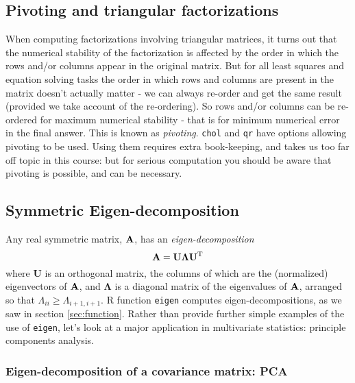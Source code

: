 \documentclass[10pt] {article}
\newcommand{\ts}{^{\rm T}}
\theoremstyle{definition}
\begin{document}
\subsection{Pivoting and triangular factorizations}
 
When computing factorizations involving triangular matrices, it turns out that the numerical stability of the factorization is affected by the order in which the rows and/or columns appear in the original matrix. But for all least squares and equation solving tasks the order in which rows and columns are present in the matrix doesn't actually matter - we can always re-order and get the same result (provided we take account of the re-ordering). So rows and/or columns can be re-ordered for maximum numerical stability - that is for minimum numerical error in the final answer. This is known as {\em pivoting}. {\tt chol} and {\tt qr} have options allowing pivoting to be used. Using them requires extra book-keeping, and takes us too far off topic in this course: but for serious computation you should be aware that pivoting is possible, and can be necessary.     
 
\subsection{Symmetric Eigen-decomposition}

Any real symmetric matrix, $\bf A$, has an {\em eigen-decomposition} 
$$
{\bf A} = {\bf U}\bm{\Lambda}{\bf U}\ts
$$
where {\bf U} is an orthogonal matrix, the columns of which are the (normalized) eigenvectors of $\bf A$, and $\bm \Lambda$ is a diagonal matrix of the eigenvalues of $\bf A$, arranged so that $\Lambda_{ii}\ge\Lambda_{i+1,i+1}$. R function {\tt eigen} computes eigen-decompositions, as we saw in section \ref{sec:function}. Rather than provide further simple examples of the use of {\tt eigen}, let's look at a major application in multivariate statistics: principle components analysis. 

\subsubsection{Eigen-decomposition of a covariance matrix: PCA \label{sec:pca}}
\end{document}
